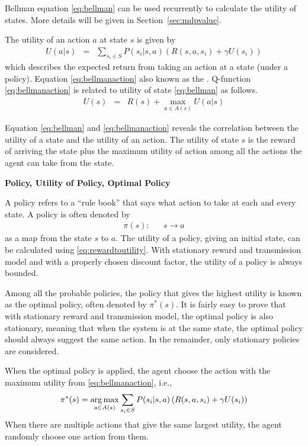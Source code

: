 Bellman equation \eqref{eq:bellman} can be used recurrently to calculate the utility of states. More details will be given in Section~\ref{sec:mdpvalue}.

The utility of an action $a$ at state $s$ is given by
\begin{eqnarray}
	U(a|s) &=& \sum_{s_i \in S} P(s_i|s,a)\left(R(s,a,s_i) + \gamma U(s_i)\right) \label{eq:bellmanaction}
\end{eqnarray}
which describes the expected return from taking an action at a state (under a policy). Equation \eqref{eq:bellmanaction} also known as the . Q-function \eqref{eq:bellmanaction} is related to utility of state \eqref{eq:bellman} as follows.
\begin{eqnarray}
	U(s) &=& R(s) + \max_{a\in A(s)} U(a|s) \nonumber
\end{eqnarray}
 
Equation \eqref{eq:bellman} and \eqref{eq:bellmanaction} reveals the correlation between the utility of a state and the utility of an action. The utility of state $s$ is the reward of arriving the state plus the maximum utility of action among all the actions the agent can take from the state.

\vspace{0.1in}
\noindent \textbf{Policy, Utility of Policy, Optimal Policy}
\vspace{0.1in}

A policy refers to a ``rule book'' that says what action to take at each and every state. A policy is often denoted by
\begin{eqnarray}
	\pi(s): && s \rightarrow a \label{eq:mdppolicy}
\end{eqnarray}
as a map from the state $s$ to $a$. The utility of a policy, giving an initial state, can be calculated using \eqref{eq:rewardtoutility}. With stationary reward and transmission model and with a properly chosen discount factor, the utility of a policy is always bounded. 

Among all the probable policies, the policy that gives the highest utility is known as the optimal policy, often denoted by $\pi^*(s)$. It is fairly easy to prove that with stationary reward and transmission model, the optimal policy is also stationary, meaning that when the system is at the same state, the optimal policy should always suggest the same action. In the remainder, only stationary policies are considered.

When the optimal policy is applied, the agent choose the action with the maximum utility from \eqref{eq:bellmanaction}, i.e.,
\begin{eqnarray}
	\pi^*(s) = \operatorname*{arg\,max}_{a\in A(s)} \sum_{s_i \in S} P(s_i|s,a)\left(R(s,a,s_i) + \gamma U(s_i)\right) \label{eq:mdpoptpolicy}
\end{eqnarray}
When there are multiple actions that give the same largest utility, the agent randomly choose one action from them.

